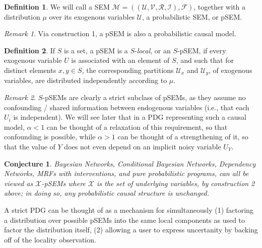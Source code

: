 \documentclass{article}
\theoremstyle{plain}
\newtheorem{conj}[theorem]{Conjecture}
\theoremstyle{definition}
\newtheorem{defn}{Definition}
\theoremstyle{remark}
\newtheorem*{remark}{Remark}
\begin{document}
\begin{defn}
	We will call a SEM $\mathcal M = ((\mathcal U, \mathcal V, \mathcal R, \mathcal I), \mathcal F)$, together with a 	distribution $\mu$ over its exogenous variables $\mathcal U$, a probabilistic SEM, or pSEM.
\end{defn}
\begin{remark}
Via construction 1, a pSEM is also a probabilistic causal model.
\end{remark}

\begin{defn} If $S$ is a set, a pSEM is a $S$-\emph{local}, or an $S$-pSEM, if every exogenous variable $U$ is associated with an element of $S$, and such that for distinct elements $x,y \in S$, the corresponding partitions $\mathcal U_{x}$ and $\mathcal U_{y}$, of exogenous variables, are distributed independently according to $\mu$.
\end{defn}

\begin{remark}
	$S$-pSEMs are clearly a strict subclass of pSEMs, as they assume no confounding / shared information between endogenous variables (i.e., that each $U_i$ is independent). 
	We will see later that in a PDG representing such a causal model, $\alpha < 1$ can be thought of a relaxation of this requirement, so that confounding is possible, while $\alpha > 1$ can be thought of a strengthening of it, so that the value of $Y$ does not even depend on an implicit noisy variable $U_Y$.
\end{remark}

\begin{conj}
	Bayesian Networks, Conditional Bayesian Networks, Dependency Networks, MRFs with interventions, and pure probabilistic programs, can all be viewed as $\mathcal X$-pSEMs where $\mathcal X$ is the set of underlying variables, by construction 2 above; in doing so, any probabilistic causal structure is unchanged.
\end{conj}
A strict PDG can be thought of as a mechanism for simultaneously (1) factoring a distribution over possible pSEMs into the same local components as used to factor the distribution itself, (2) allowing a user to express uncertanity by backing off of the locality observation.
\end{document}
